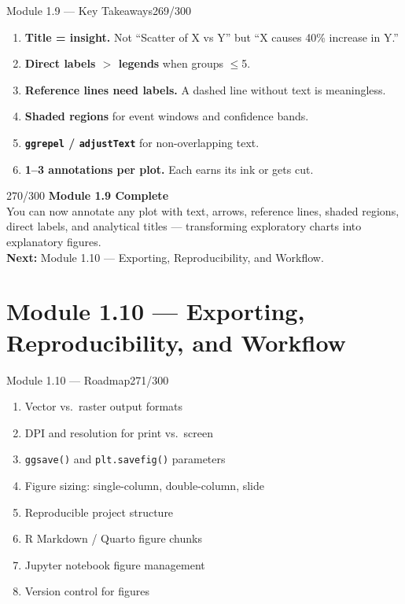 \documentclass[10pt]{beamer}
\newcommand{\smark}[1]{\hfill{\scriptsize\color{codegray}#1}}
\begin{document}
\begin{frame}{Module 1.9 --- Key Takeaways}\smark{269/300}
\begin{enumerate}
    \item \textbf{Title = insight.} Not ``Scatter of X vs Y'' but ``X causes 40\% increase in Y.''
    \item \textbf{Direct labels $>$ legends} when groups $\leq$5.
    \item \textbf{Reference lines need labels.} A dashed line without text is meaningless.
    \item \textbf{Shaded regions} for event windows and confidence bands.
    \item \textbf{\texttt{ggrepel} / \texttt{adjustText}} for non-overlapping text.
    \item \textbf{1--3 annotations per plot.} Each earns its ink or gets cut.
\end{enumerate}
\end{frame}

\begin{frame}{}\smark{270/300}
\centering\vspace{1.5cm}
{\Large\textbf{Module 1.9 Complete}}\\[0.5cm]
You can now annotate any plot with text, arrows, reference lines, shaded regions, direct labels, and analytical titles --- transforming exploratory charts into explanatory figures.\\[0.5cm]
\textbf{Next:} Module 1.10 --- Exporting, Reproducibility, and Workflow.
\end{frame}

\section{Module 1.10 --- Exporting, Reproducibility, and Workflow}

\begin{frame}{Module 1.10 --- Roadmap}\smark{271/300}
\begin{enumerate}
    \item Vector vs.\ raster output formats
    \item DPI and resolution for print vs.\ screen
    \item \texttt{ggsave()} and \texttt{plt.savefig()} parameters
    \item Figure sizing: single-column, double-column, slide
    \item Reproducible project structure
    \item R Markdown / Quarto figure chunks
    \item Jupyter notebook figure management
    \item Version control for figures
\end{enumerate}
\end{frame}
\end{document}

